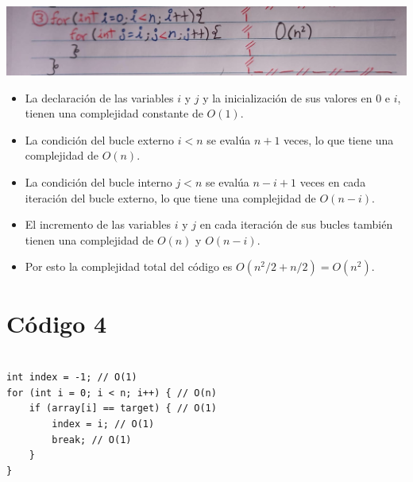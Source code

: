 \documentclass[a4paper,onecolumn,10pt]{article}
\begin{document}
\includegraphics[width=1.15\linewidth]{imagenes/punto 3.jpeg}
\\
\begin{itemize}

    \item La declaración de las variables $i$ y $j$ y la inicialización de sus valores en $0$ e $i$, tienen una complejidad constante de $O(1)$.
    
    \item La condición del bucle externo $i < n$ se evalúa $n + 1$ veces, lo que tiene una complejidad de $O(n)$.
    
    \item La condición del bucle interno $j < n$ se evalúa $n - i + 1$ veces en cada iteración del bucle externo, lo que tiene una complejidad de $O(n - i)$.
    
    \item El incremento de las variables $i$ y $j$ en cada iteración de sus bucles también tienen una complejidad de $O(n)$ y $O(n - i)$.
    
    \item Por esto la complejidad total del código es $O(n^2/2 + n/2) = O(n^2)$.

\end{itemize}

\section{Código 4}

\begin{verbatim}

int index = -1; // O(1)
for (int i = 0; i < n; i++) { // O(n)
    if (array[i] == target) { // O(1)
        index = i; // O(1)
        break; // O(1)
    }
}

\end{verbatim}
\end{document}
